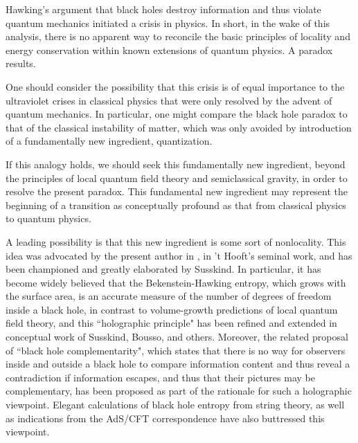 \Date{}


Hawking's argument that black holes destroy information and thus violate quantum mechanics initiated a crisis  in physics.  In short, in the wake of this analysis, there is no apparent way to reconcile 
the basic principles of locality and energy conservation within known extensions of quantum physics.  A paradox results.

One should consider the possibility that this crisis is of equal importance  to the ultraviolet crises in classical physics that were only resolved by the advent of quantum mechanics.  In particular, one might compare the black hole paradox to that of the classical instability of matter, which was only avoided by introduction of a fundamentally new ingredient,  quantization.

If this analogy holds, we should seek this fundamentally new ingredient, beyond the principles of local quantum field theory and semiclassical gravity, in order to resolve the present paradox.  This fundamental new ingredient may represent the beginning of a transition as conceptually profound as that from classical physics to quantum physics.

A leading possibility is that this new ingredient is some sort of nonlocality.   This idea was advocated by the present author in , in 't Hooft's seminal work,  and has been
championed and greatly elaborated by Susskind\Sussholo.  In particular, it has become widely believed that the Bekenstein-Hawking entropy, which grows with the surface area, is an accurate measure of the number of degrees of freedom inside a black hole, in contrast to volume-growth predictions of local quantum field theory, and this  ``holographic principle" has been refined and extended in conceptual work of Susskind, Bousso, and others.  Moreover, the related proposal of  ``black hole complementarity", which states that there is no way for observers inside and outside a black hole to compare information content and thus reveal a contradiction if information escapes, and thus that their pictures may be complementary, has been proposed as part of the rationale for such a holographic viewpoint.  Elegant calculations of black hole entropy from string theory, as well as indications from the AdS/CFT correspondence have also buttressed this viewpoint.


